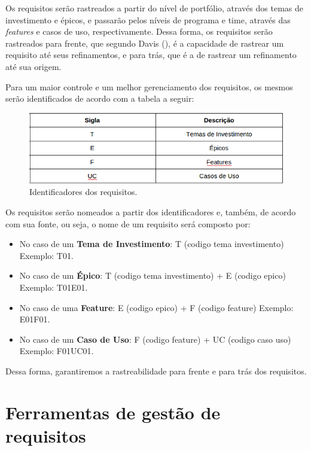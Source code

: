   Os requisitos serão rastreados a partir do nível de portfólio, 
  através dos temas de investimento e épicos, e passarão pelos níveis de programa e time, 
  através das \textit{features} e casos de uso, respectivamente. Dessa forma, os requisitos serão rastreados para frente, 
  que segundo Davis (\citeyear{davis93}), é a capacidade de rastrear um requisito até seus refinamentos, 
  e para trás, que é a de rastrear um refinamento até sua origem.
  
  Para um maior controle e um melhor gerenciamento dos requisitos, 
  os mesmos serão identificados de acordo com a tabela a seguir:
  
  \begin{figure}[!htbp]
    \centering
    \includegraphics[scale=0.7]{editaveis/figuras/identificadores_requisitos}
    \caption[Identificadores dos requisitos]{Identificadores dos requisitos. \footnotemark}
    \label{identificadores_requisitos}
  \end{figure}
  
  Os requisitos serão nomeados a partir dos identificadores e, também, de acordo com sua fonte, ou seja, 
  o nome de um requisito será composto por:
  
  \begin{itemize}
   \item No caso de um \textbf{Tema de Investimento}: T (codigo tema investimento) Exemplo: T01.
   \item No caso de um \textbf{Épico}: T (codigo tema investimento) + E (codigo epico) Exemplo: T01E01.
   \item No caso de uma \textbf{Feature}: E (codigo epico) + F (codigo feature) Exemplo: E01F01.
   \item No caso de um \textbf{Caso de Uso}:  F (codigo feature) + UC (codigo caso uso) Exemplo: F01UC01.
  \end{itemize}

  Dessa forma, garantiremos a rastreabilidade para frente e para trás dos requisitos.
  
  \section{Ferramentas de gestão de requisitos}
    
